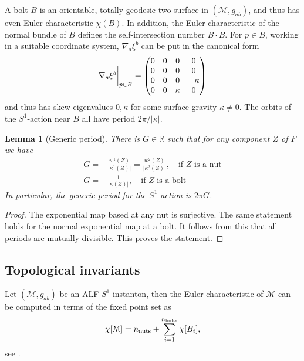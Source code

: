 \documentclass[a4paper,11pt,reqno]{amsart}
\newcommand{\Reals}{\mathbb{R}}
\newcommand{\bolt}{B}
\newcommand{\cM}{\mathcal{M}}
\theoremstyle{plain}
\newtheorem{lemma}[thm]{Lemma}
\newcommand{\nnuts}{n_{\text{\rm nuts}}}
\newcommand{\nbolts}{n_{\text{\rm bolts}}}
\numberwithin{equation}{section}
\newcommand{\Fixed}{F}
\begin{document}
A bolt $\bolt$ is an orientable, totally geodesic 
two-surface in $(\cM, g_{ab})$,  and thus has even Euler characteristic $\chi(\bolt)$. In addition, the Euler characteristic of the normal bundle of $\bolt$ defines the self-intersection number $\bolt\!\cdot\! \bolt$.  For $p \in \bolt$, working in a suitable coordinate system, $\nabla_a \xi^b$ can be put in the canonical  form 
\begin{align} \label{eq:nablaxi(bolt)}
\nabla_a \xi^b \bigg{|}_{p \in \bolt} = \begin{pmatrix}0&0&0&0\\0 &0&0&0\\0&0&0&-\kappa\\0&0&\kappa&0\end{pmatrix}
\end{align} 
and thus has skew eigenvalues $0, \kappa$ for some surface gravity $\kappa \ne 0$. The orbits of the $S^1$-action near $\bolt$ all have period $2\pi/|\kappa|$. 


\begin{lemma}[Generic period] \label{lem:generic} 
%
%
There is $G \in \Reals$ such that for any component $Z$ of $\Fixed$ we have    
\begin{align} 
G ={}& \frac{w^1(Z)}{|\kappa^1(Z)|} = \frac{w^2(Z)}{|\kappa^2(Z)|}, \quad \text{if $Z$ is a nut} \\
G ={}& \frac{1}{|\kappa(Z)|}, \quad \text{if $Z$ is a bolt}
\end{align} 
%
In particular, the generic period for the $S^1$-action is $2\pi G$. 
\end{lemma} 
\begin{proof} 
The exponential map based at any nut is surjective. The same statement holds for the normal exponential map at a bolt. It follows from this that all periods are mutually divisible. This proves the statement. 
\end{proof} 
  
 
\subsection{Topological invariants} 
\label{sec:topin}

Let $(\cM, g_{ab})$ be an ALF $S^1$ instanton, then the Euler characteristic of $\cM$ can be computed in terms of the fixed point set as
\begin{align} \label{eq:chinutbolt}
\chi[\cM] = \nnuts + \sum_{i=1}^{\nbolts} \chi[\bolt_i], 
\end{align} 
see \cite{HirzebruchBergerJung}.
\end{document}
